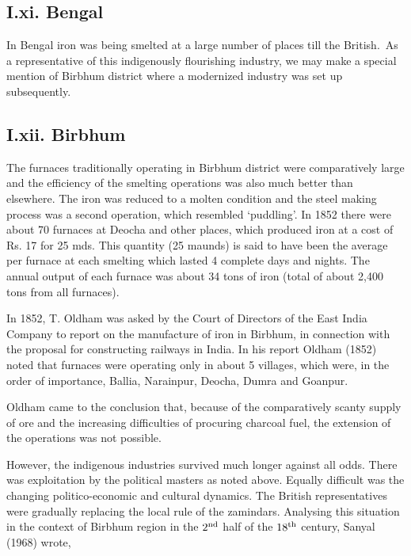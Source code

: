 \vspace{-.3cm}

\subsection*{I.xi.  Bengal}\label{subsection-11}

\vspace{-.2cm}

In Bengal iron was being smelted at a large number of places till the British.~As a representative of this indigenously flourishing industry, we may make a special mention of Birbhum district where a modernized industry was set up subsequently.

\vspace{-.3cm}

\subsection*{I.xii. Birbhum}\label{subsection-12}

\vspace{-.2cm}

The furnaces traditionally operating in Birbhum district were comparatively large and the efficiency of the smelting operations was also much better than elsewhere.  The iron was reduced to a molten condition and the steel making process was a second operation, which resembled `puddling'.  In 1852 there were about 70 furnaces at Deocha and other places, which produced iron at a cost of Rs. 17 for 25 mds.  This quantity (25 maunds) is said to have been the average per furnace at each smelting which lasted 4 complete days and nights.   The annual output of each furnace was about 34 tons of iron (total of about 2,400 tons from all furnaces).

In 1852, T. Oldham was asked by the Court of Directors of the East India Company to report on the manufacture of iron in Birbhum, in connection with the proposal for constructing railways in India. In his report Oldham (1852) noted that furnaces were operating only in about 5 villages, which were, in the order of importance, Ballia, Narainpur, Deocha, Dumra and Goanpur.

Oldham came to the conclusion that, because of the comparatively scanty supply of ore and the increasing difficulties of procuring charcoal fuel, the extension of the operations was not possible.

However, the indigenous industries survived much longer against all odds.  There was exploitation by the political masters as noted above.  Equally difficult was the changing politico-economic and cultural dynamics.  The British representatives were gradually replacing the local rule of the zamindars.  Analysing this situation in the context of Birbhum region in the $2^{\rm nd}$ half of the $18^{\rm th}$ century, Sanyal (1968) wrote, 

